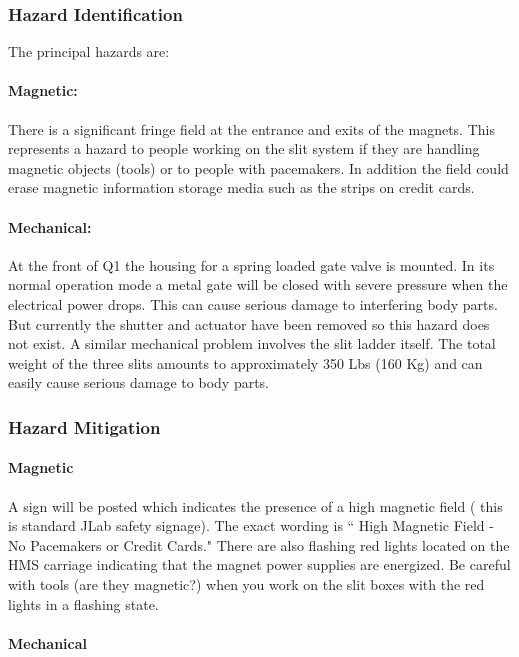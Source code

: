 \subsubsection{Hazard Identification}

The principal hazards are:
\paragraph{Magnetic:} There is a significant fringe field at
the entrance and exits of the magnets. This represents a hazard
to people working on the slit system if they are handling magnetic
objects (tools) or to people with pacemakers. In addition the field could erase magnetic
information storage media such as the strips on credit cards.
\paragraph{Mechanical:} At the front of Q1 the housing for a spring loaded gate valve is
mounted. In its normal operation mode a metal gate will be closed with
severe pressure when the electrical power drops. This can cause serious
damage to interfering body parts.  But currently the shutter and
actuator have been removed so this hazard does not exist.  
A similar mechanical problem involves the slit ladder itself. The total weight of
the three slits amounts to approximately 350 Lbs (160 Kg) and can easily
cause serious damage to body parts.

\subsubsection{Hazard Mitigation}

\paragraph{Magnetic}

A sign will be posted which indicates the presence of a high magnetic
field ( this is standard JLab safety signage). The exact wording is
`` High Magnetic Field - No Pacemakers or Credit Cards." There are also
flashing red lights located on the HMS carriage indicating that the
magnet power supplies are energized. Be careful with tools (are they magnetic?)
when you work on the slit boxes with the red lights in a flashing state.

\paragraph{Mechanical}

